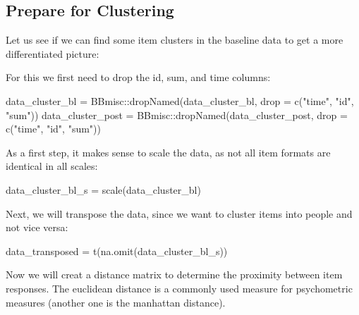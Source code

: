 \documentclass[
]{book}
\newenvironment{Shaded}{\begin{snugshade}}{\end{snugshade}}
\newcommand{\AttributeTok}[1]{\textcolor[rgb]{0.77,0.63,0.00}{#1}}
\newcommand{\FunctionTok}[1]{\textcolor[rgb]{0.00,0.00,0.00}{#1}}
\newcommand{\NormalTok}[1]{#1}
\newcommand{\OtherTok}[1]{\textcolor[rgb]{0.56,0.35,0.01}{#1}}
\newcommand{\SpecialCharTok}[1]{\textcolor[rgb]{0.00,0.00,0.00}{#1}}
\newcommand{\StringTok}[1]{\textcolor[rgb]{0.31,0.60,0.02}{#1}}
\begin{document}
\hypertarget{prepare-for-clustering}{%
\subsection{Prepare for Clustering}\label{prepare-for-clustering}}

Let us see if we can find some item clusters in the baseline data to get a more differentiated picture:

For this we first need to drop the id, sum, and time columns:

\begin{Shaded}
\begin{Highlighting}[]
\NormalTok{data\_cluster\_bl }\OtherTok{=}\NormalTok{ BBmisc}\SpecialCharTok{::}\FunctionTok{dropNamed}\NormalTok{(data\_cluster\_bl, }\AttributeTok{drop =} \FunctionTok{c}\NormalTok{(}\StringTok{"time"}\NormalTok{, }\StringTok{"id"}\NormalTok{, }\StringTok{"sum"}\NormalTok{))}
\NormalTok{data\_cluster\_post }\OtherTok{=}\NormalTok{ BBmisc}\SpecialCharTok{::}\FunctionTok{dropNamed}\NormalTok{(data\_cluster\_post, }\AttributeTok{drop =} \FunctionTok{c}\NormalTok{(}\StringTok{"time"}\NormalTok{, }\StringTok{"id"}\NormalTok{, }\StringTok{"sum"}\NormalTok{))}
\end{Highlighting}
\end{Shaded}

As a first step, it makes sense to scale the data, as not all item formats are identical in all scales:

\begin{Shaded}
\begin{Highlighting}[]
\NormalTok{data\_cluster\_bl\_s }\OtherTok{=} \FunctionTok{scale}\NormalTok{(data\_cluster\_bl)}
\end{Highlighting}
\end{Shaded}

Next, we will transpose the data, since we want to cluster items into people and not vice versa:

\begin{Shaded}
\begin{Highlighting}[]
\NormalTok{data\_transposed }\OtherTok{=} \FunctionTok{t}\NormalTok{(}\FunctionTok{na.omit}\NormalTok{(data\_cluster\_bl\_s))}
\end{Highlighting}
\end{Shaded}

Now we will creat a distance matrix to determine the proximity between item responses. The euclidean distance is a commonly used measure for psychometric measures (another one is the manhattan distance).
\end{document}
